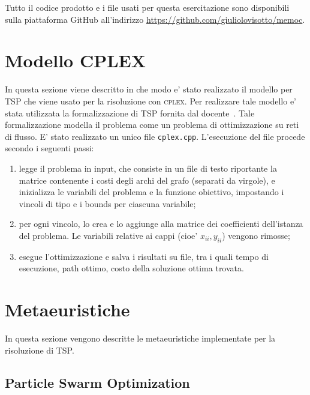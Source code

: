 \documentclass[
12pt, %
a4paper, %
oneside, %
headinclude,footinclude, %
BCOR5mm, %
]{scrartcl}
\begin{document}
Tutto il codice prodotto e i file usati per questa esercitazione sono disponibili sulla piattaforma GitHub all'indirizzo \url{https://github.com/giuliolovisotto/memoc}.

\section{Modello CPLEX} \label{sec:cplex}

In questa sezione viene descritto in che modo e' stato realizzato il modello per TSP che viene usato per la risoluzione con \textsc{cplex}. Per realizzare tale modello e' stata utilizzata la formalizzazione di TSP fornita dal docente~\cite{luigitraccia1}. Tale formalizzazione modella il problema come un problema di ottimizzazione su reti di flusso. E' stato realizzato un unico file \texttt{cplex.cpp}. L'esecuzione del file procede secondo i seguenti passi:
\begin{enumerate}
 \item legge il problema in input, che consiste in un file di testo riportante la matrice contenente i costi degli archi del grafo (separati da virgole), e inizializza le variabili del problema e la funzione obiettivo, impostando i vincoli di tipo e i bounds per ciascuna variabile;
 \item per ogni vincolo, lo crea e lo aggiunge alla matrice dei coefficienti dell'istanza del problema. Le variabili relative ai cappi (cioe' $x_{ii}, y_{ii}$) vengono rimosse;
 \item esegue l'ottimizzazione e salva i risultati su file, tra i quali tempo di esecuzione, path ottimo, costo della soluzione ottima trovata.
\end{enumerate}


\section{Metaeuristiche} \label{sec:eur}
In questa sezione vengono descritte le metaeuristiche implementate per la risoluzione di TSP. 

\subsection{Particle Swarm Optimization}
\end{document}
